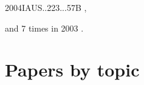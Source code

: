 \documentclass[12pt]{article}
\begin{document}
\begin{description}
{2004IAUS..223...57B%
},\item
and 7 times in 2003 \citep{
2003A&A...411..321Y,%
2003A&A...407....7Y,%
2003AGUFMGP11C0280M,%
2003ApJ...597L.141H,%
2003eclm.book..269B,%
2003astro.ph..3371B,%
2003PhRvE..68b6304D%
}.
\end{description}

\section{Papers by topic}
\end{document}
